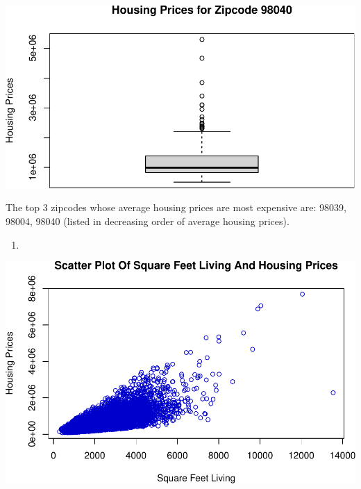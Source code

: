 \documentclass[
]{article}
\newenvironment{Shaded}{\begin{snugshade}}{\end{snugshade}}
\newcommand{\AttributeTok}[1]{\textcolor[rgb]{0.77,0.63,0.00}{#1}}
\newcommand{\FunctionTok}[1]{\textcolor[rgb]{0.00,0.00,0.00}{#1}}
\newcommand{\NormalTok}[1]{#1}
\newcommand{\SpecialCharTok}[1]{\textcolor[rgb]{0.00,0.00,0.00}{#1}}
\newcommand{\StringTok}[1]{\textcolor[rgb]{0.31,0.60,0.02}{#1}}
\providecommand{\tightlist}{%
  \setlength{\itemsep}{0pt}\setlength{\parskip}{0pt}}
\begin{document}
\includegraphics{HW2_Wu-Yulun_files/figure-latex/unnamed-chunk-1-3.pdf}

The top 3 zipcodes whose average housing prices are most expensive are:
98039, 98004, 98040 (listed in decreasing order of average housing
prices).

\begin{enumerate}
\def\labelenumi{(\alph{enumi})}
\setcounter{enumi}{1}
\tightlist
\item
\end{enumerate}

\begin{Shaded}
\end{Shaded}

\includegraphics{HW2_Wu-Yulun_files/figure-latex/unnamed-chunk-2-1.pdf}
\end{document}

